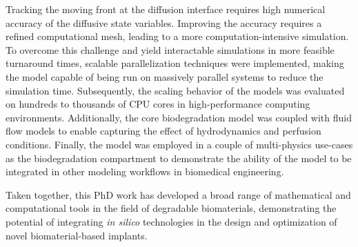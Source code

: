 Tracking the moving front at the diffusion interface requires high numerical accuracy of the diffusive state variables. Improving the accuracy requires a refined computational mesh, leading to a more computation-intensive simulation. To overcome this challenge and yield interactable simulations in more feasible turnaround times, scalable parallelization techniques were implemented, making the model capable of being run on massively parallel systems to reduce the simulation time. Subsequently, the scaling behavior of the models was evaluated on hundreds to thousands of CPU cores in high-performance computing environments. Additionally, the core biodegradation model was coupled with fluid flow models to enable capturing the effect of hydrodynamics and perfusion conditions. Finally, the model was employed in a couple of multi-physics use-cases as the biodegradation compartment to demonstrate the ability of the model to be integrated in other modeling workflows in biomedical engineering.

Taken together, this PhD work has developed a broad range of mathematical and computational tools in the field of degradable biomaterials, demonstrating the potential of integrating \textit{in silico} technologies in the design and optimization of novel biomaterial-based implants. 

\cleardoublepage

